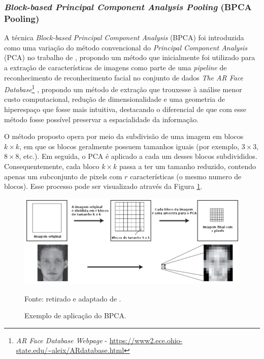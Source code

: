 \subsubsection{\textit{Block-based Principal Component Analysis Pooling} (BPCA Pooling)}
\label{project:bpca}
A técnica \textit{Block-based Principal Component Analysis} (BPCA) foi introduzida como uma variação do método convencional do \textit{Principal Component Analysis} (PCA) no trabalho de \cite{Salvadeo2011}, propondo um método que inicialmente foi utilizado para a extração de características de imagens como parte de uma \textit{pipeline} de reconhecimento de reconhecimento facial no conjunto de dados \textit{The AR Face Database}\footnote{\textit{AR Face Database Webpage} - \url{https://www2.ece.ohio-state.edu/~aleix/ARdatabase.html}} \citep{MartNez1998TheDatabase} , propondo um método de extração que trouxesse à análise menor custo computacional, redução de dimensionalidade e uma geometria de hiperespaço que fosse mais intuitiva, destacando o diferencial de que com esse método fosse possível preservar a espacialidade da informação.

O método proposto opera por meio da subdivisão de uma imagem em blocos $k \times k$, em que os blocos geralmente possuem tamanhos iguais (por exemplo, $3 \times 3$, $8 \times 8$, etc.). Em seguida, o PCA é aplicado a cada um desses blocos subdivididos. Consequentemente, cada bloco $k \times k$ passa a ter um tamanho reduzido, contendo apenas um subconjunto de pixels com $r$ características (o mesmo numero de blocos). Esse processo pode ser visualizado através da Figura \ref{project:fig:bpca_1}.

\begin{figure}[H]
    \centering
    \caption{Exemplo de aplicação do BPCA.}
    \label{project:fig:bpca_1}
    \includegraphics[width=1\textwidth]{recursos/imagens/project/BPCA.png}

    Fonte: retirado e adaptado de \cite{Salvadeo2011}.
\end{figure}

